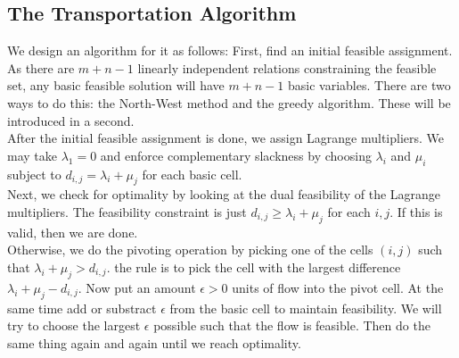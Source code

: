 \subsection{The Transportation Algorithm}
We design an algorithm for it as follows:
First, find an initial feasible assignment.
As there are $m+n-1$ linearly independent relations constraining the feasible set, any basic feasible solution will have $m+n-1$ basic variables.
There are two ways to do this: the North-West method and the greedy algorithm.
These will be introduced in a second.\\
After the initial feasible assignment is done, we assign Lagrange multipliers.
We may take $\lambda_1=0$ and enforce complementary slackness by choosing $\lambda_i$ and $\mu_i$ subject to $d_{i,j}=\lambda_i+\mu_j$ for each basic cell.\\
Next, we check for optimality by looking at the dual feasibility of the Lagrange multipliers.
The feasibility constraint is just $d_{i,j}\ge\lambda_i+\mu_j$ for each $i,j$.
If this is valid, then we are done.\\
Otherwise, we do the pivoting operation by picking one of the cells $(i,j)$ such that $\lambda_i+\mu_j>d_{i,j}$.
the rule is to pick the cell with the largest difference $\lambda_i+\mu_j-d_{i,j}$.
Now put an amount $\epsilon>0$ units of flow into the pivot cell.
At the same time add or substract $\epsilon$ from the basic cell to maintain feasibility.
We will try to choose the largest $\epsilon$ possible such that the flow is feasible.
Then do the same thing again and again until we reach optimality.
